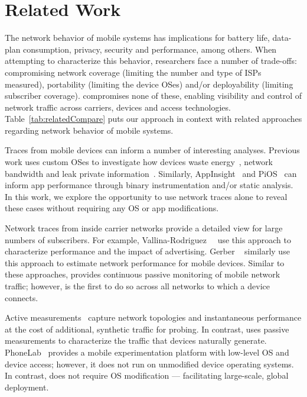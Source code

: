 
\section{Related Work}
\label{sec:related}



The network behavior of mobile systems has implications for battery life, 
data-plan consumption, privacy, security and performance, among others. 
When attempting to characterize this behavior, researchers face a number 
of trade-offs: compromising network coverage (limiting the number and type of ISPs measured), 
portability (limiting the device OSes) and/or deployability (limiting subscriber coverage).
\platname compromises 
none of these, enabling visibility and control of network traffic across carriers, devices and access 
technologies. Table~\ref{tab:relatedCompare} puts our approach in context with related  
approaches regarding network behavior of mobile systems. 


Traces from mobile devices can inform a number of interesting analyses. Previous work 
uses custom OSes to investigate how devices waste energy~\cite{pathak:eprof}, network bandwidth and 
leak private information~\cite{enck:taintdroid,hornyack:appfence}. Similarly, AppInsight~\cite{ravindranath:appinsight} and PiOS~\cite{egele:pios} can inform 
app performance through binary instrumentation and/or static analysis. In this work, we explore the opportunity to use network traces 
alone to reveal these cases without requiring any OS or app modifications. 

Network traces from inside carrier networks provide a detailed view for large numbers 
of subscribers. For example, Vallina-Rodriguez~\etal~\cite{vallina-rod:ads} use this approach to characterize performance and 
the impact of advertising. Gerber \etal~\cite{gerber:passivespeed} similarly use this approach to 
estimate network performance for mobile devices.  %
Similar to these approaches, \platname provides continuous passive monitoring of mobile network 
traffic; however, \platname is the first to do so across all networks to which a device connects.

Active measurements~\cite{wang:middleboxes,sommers:cellwifi} capture network topologies and instantaneous 
performance at the cost of additional, synthetic traffic for probing. In contrast, \platname uses 
passive measurements to characterize the traffic that devices
naturally generate. PhoneLab~\cite{PhoneLab} provides a mobile experimentation platform with 
low-level OS and device access; however, it does not run on unmodified device operating systems. 
In contrast, \meddle does not require OS modification --- facilitating large-scale, global deployment.



